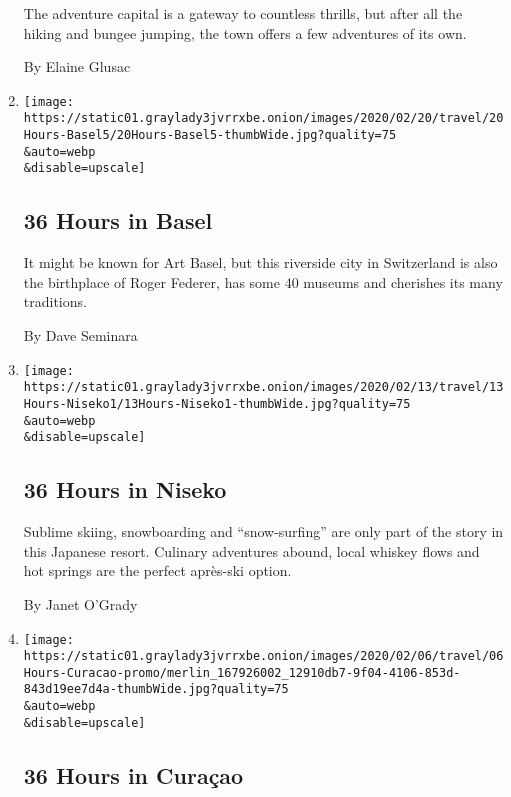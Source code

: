 \begin{enumerate}
  The adventure capital is a gateway to countless thrills, but after all
  the hiking and bungee jumping, the town offers a few adventures of its
  own.

  By Elaine Glusac
\item
  \href{/2020/02/20/travel/what-to-do-36-hours-in-switzerland.html}{}

  \texttt{[image: https://static01.graylady3jvrrxbe.onion/images/2020/02/20/travel/20Hours-Basel5/20Hours-Basel5-thumbWide.jpg?quality=75\\\&auto=webp\\\&disable=upscale]}

  \hypertarget{36-hours-in-basel}{%
  \subsection{36 Hours in Basel}\label{36-hours-in-basel}}

  It might be known for Art Basel, but this riverside city in
  Switzerland is also the birthplace of Roger Federer, has some 40
  museums and cherishes its many traditions.

  By Dave Seminara
\item
  \href{/2020/02/13/travel/what-to-do-36-hours-in-niseko-japan.html}{}

  \texttt{[image: https://static01.graylady3jvrrxbe.onion/images/2020/02/13/travel/13Hours-Niseko1/13Hours-Niseko1-thumbWide.jpg?quality=75\\\&auto=webp\\\&disable=upscale]}

  \hypertarget{36-hours-in-niseko}{%
  \subsection{36 Hours in Niseko}\label{36-hours-in-niseko}}

  Sublime skiing, snowboarding and ``snow-surfing'' are only part of the
  story in this Japanese resort. Culinary adventures abound, local
  whiskey flows and hot springs are the perfect après-ski option.

  By Janet O'Grady
\item
  \href{/2020/02/06/travel/what-to-do-36-hours-in-curacao.html}{}

  \texttt{[image: https://static01.graylady3jvrrxbe.onion/images/2020/02/06/travel/06Hours-Curacao-promo/merlin\_167926002\_12910db7-9f04-4106-853d-843d19ee7d4a-thumbWide.jpg?quality=75\\\&auto=webp\\\&disable=upscale]}

  \hypertarget{36-hours-in-curauxe7ao}{%
  \subsection{36 Hours in Curaçao}\label{36-hours-in-curauxe7ao}}


\end{enumerate}
